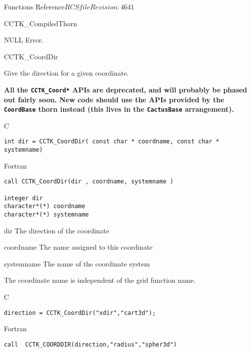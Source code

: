 \begin{cactuspart}{ Functions Reference}{$RCSfile$}{$Revision: 4641 $}
\begin{FunctionDescription}{CCTK\_CompiledThorn}
\begin{ErrorSection}
\begin{Error}{NULL}
Error.
\end{Error}
\end{ErrorSection}
\end{FunctionDescription}


\begin{FunctionDescription}{CCTK\_CoordDir}%
{Give the direction for a given coordinate.

\textbf{All the \texttt{CCTK\_Coord*} APIs are deprecated,
and will probably be phased out fairly soon.
New code should use the APIs provided by the \texttt{CoordBase} thorn
instead (this lives in the \texttt{CactusBase} arrangement).}
}
\label{CCTK-CoordDir}
\begin{SynopsisSection}
\begin{Synopsis}{C}
\begin{verbatim}int dir = CCTK_CoordDir( const char * coordname, const char * systemname)\end{verbatim}
\end{Synopsis}
\begin{Synopsis}{Fortran}
\begin{verbatim}call CCTK_CoordDir(dir , coordname, systemname )

integer dir
character*(*) coordname
character*(*) systemname \end{verbatim}
\end{Synopsis}
\end{SynopsisSection}
\begin{ParameterSection}
\begin{Parameter}{dir}
The direction of the coordinate
\end{Parameter}
\begin{Parameter}{coordname}
The name assigned to this coordinate
\end{Parameter}
\begin{Parameter}{systemname}
The name of the coordinate system
\end{Parameter}
\end{ParameterSection}
\begin{Discussion}
The coordinate name is independent of the grid function name.
\end{Discussion}
\begin{ExampleSection}
\begin{Example}{C}
\begin{verbatim}
direction = CCTK_CoordDir("xdir","cart3d");
\end{verbatim}
\end{Example}
\begin{Example}{Fortran}
\begin{verbatim}
call  CCTK_COORDDIR(direction,"radius","spher3d")
\end{verbatim}
\end{Example}
\end{ExampleSection}
\end{FunctionDescription}


\end{cactuspart}
